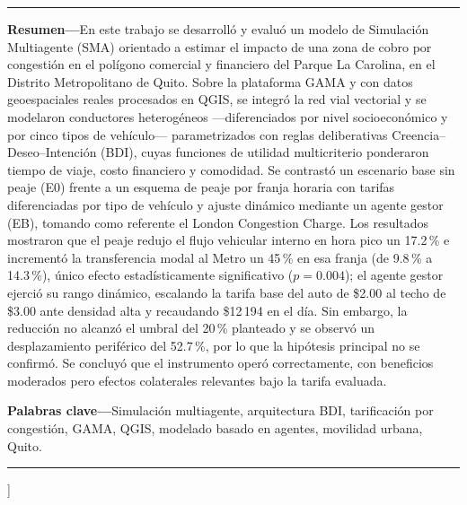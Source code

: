 \documentclass[twocolumn,10pt]{article}
\begin{document}
\begin{center}
    \vspace{14pt}
    \begin{minipage}{0.93\textwidth}
      {\color{azulUCE}\rule{\linewidth}{0.5pt}}\par\vspace{6pt}
      {\small\noindent\textbf{Resumen---}En este trabajo se desarroll\'o y evalu\'o un
      modelo de Simulaci\'on Multiagente (SMA) orientado a estimar el impacto de una
      zona de cobro por congesti\'on en el pol\'igono comercial y financiero del Parque
      La Carolina, en el Distrito Metropolitano de Quito. Sobre la plataforma GAMA y
      con datos geoespaciales reales procesados en QGIS, se integr\'o la red vial
      vectorial y se modelaron conductores heterog\'eneos ---diferenciados por nivel
      socioecon\'omico y por cinco tipos de veh\'iculo--- parametrizados con reglas
      deliberativas Creencia--Deseo--Intenci\'on (BDI), cuyas funciones de utilidad
      multicriterio ponderaron tiempo de viaje, costo financiero y comodidad. Se
      contrast\'o un escenario base sin peaje (E0) frente a un esquema de peaje por
      franja horaria con tarifas diferenciadas por tipo de veh\'iculo y ajuste din\'amico
      mediante un agente gestor (EB), tomando como referente el London Congestion
      Charge. Los resultados mostraron que el peaje redujo el flujo vehicular interno en
      hora pico un 17.2\,\% e increment\'o la transferencia modal al Metro un 45\,\% en esa
      franja (de 9.8\,\% a 14.3\,\%), \'unico efecto estad\'isticamente significativo
      ($p=0.004$); el agente gestor ejerci\'o su rango din\'amico, escalando la tarifa
      base del auto de \$2.00 al techo de \$3.00 ante densidad alta y recaudando
      \$12\,194 en el d\'ia. Sin embargo, la reducci\'on no alcanz\'o el umbral del 20\,\%
      planteado y se observ\'o un desplazamiento perif\'erico del 52.7\,\%, por lo que la
      hip\'otesis principal no se confirm\'o. Se concluy\'o que el instrumento oper\'o
      correctamente, con beneficios moderados pero efectos colaterales relevantes bajo
      la tarifa evaluada.\par}
      \vspace{6pt}
      {\small\noindent\textbf{Palabras clave---}Simulaci\'on multiagente, arquitectura
      BDI, tarificaci\'on por congesti\'on, GAMA, QGIS, modelado basado en agentes,
      movilidad urbana, Quito.\par}
      \vspace{6pt}
      {\color{azulUCE}\rule{\linewidth}{0.5pt}}
    \end{minipage}
    \vspace{16pt}
  \end{center}
]
\end{document}
